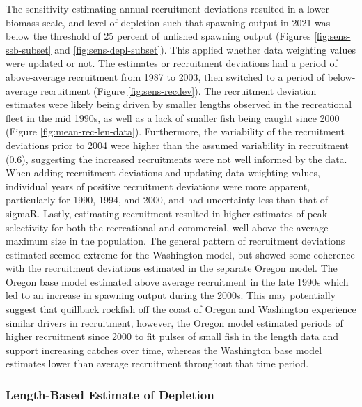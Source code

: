 \documentclass[11pt,
  english,
  letterpaper,
]{article}
\begin{document}
The sensitivity estimating annual recruitment deviations resulted in a lower biomass scale, and level of depletion such that spawning output in 2021 was below the threshold of 25 percent of unfished spawning output (Figures \ref{fig:sens-ssb-subset} and \ref{fig:sens-depl-subset}). This applied whether data weighting values were updated or not. The estimates or recruitment deviations had a period of above-average recruitment from 1987 to 2003, then switched to a period of below-average recruitment (Figure \ref{fig:sens-recdev}). The recruitment deviation estimates were likely being driven by smaller lengths observed in the recreational fleet in the mid 1990s, as well as a lack of smaller fish being caught since 2000 (Figure \ref{fig:mean-rec-len-data}). Furthermore, the variability of the recruitment deviations prior to 2004 were higher than the assumed variability in recruitment (0.6), suggesting the increased recruitments were not well informed by the data. When adding recruitment deviations and updating data weighting values, individual years of positive recruitment deviations were more apparent, particularly for 1990, 1994, and 2000, and had uncertainty less than that of sigmaR. Lastly, estimating recruitment resulted in higher estimates of peak selectivity for both the recreational and commercial, well above the average maximum size in the population. The general pattern of recruitment deviations estimated seemed extreme for the Washington model, but showed some coherence with the recruitment deviations estimated in the separate Oregon model. The Oregon base model estimated above average recruitment in the late 1990s which led to an increase in spawning output during the 2000s. This may potentially suggest that quillback rockfish off the coast of Oregon and Washington experience similar drivers in recruitment, however, the Oregon model estimated periods of higher recruitment since 2000 to fit pulses of small fish in the length data and support increasing catches over time, whereas the Washington base model estimates lower than average recruitment throughout that time period.

\leavevmode\tagmcend\tagstructend\par


\hypertarget{length-based-estimate-of-depletion}{%
\subsubsection{Length-Based Estimate of Depletion}\label{length-based-estimate-of-depletion}}
\end{document}
